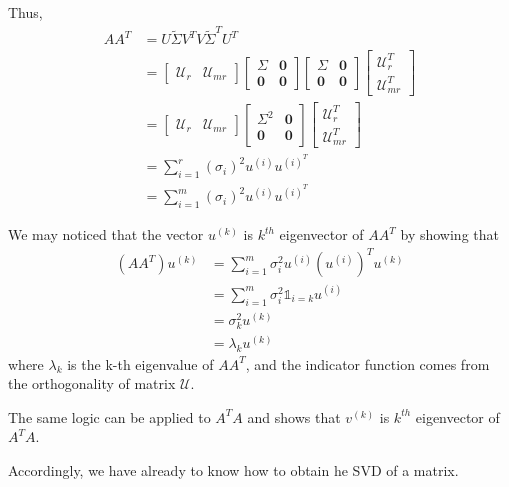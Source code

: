 Thus,
\begin{align*}
AA^T &= U\tilde{\Sigma} V^TV\tilde{\Sigma}^TU^T\\
&=
\begin{bmatrix}
\mathcal{U}_r & \mathcal{U}_{mr}
\end{bmatrix}
\begin{bmatrix}
\Sigma & \textbf{0}\\
\textbf{0}&\textbf{0}
\end{bmatrix}
\begin{bmatrix}
\Sigma & \textbf{0}\\
\textbf{0}&\textbf{0}
\end{bmatrix}
\begin{bmatrix}
\mathcal{U}_r^T\\
\mathcal{U}_{mr}^T
\end{bmatrix}\\
&
=\begin{bmatrix}
\mathcal{U}_r & \mathcal{U}_{mr}
\end{bmatrix}
\begin{bmatrix}
\Sigma^2 & \textbf{0}\\
\textbf{0}&\textbf{0}
\end{bmatrix}
\begin{bmatrix}
\mathcal{U}_r^T\\
\mathcal{U}_{mr}^T
\end{bmatrix}\\
&= \sum^r_{i=1}(\sigma_i)^2u^{(i)}u^{(i)^T}\\
&= \sum^m_{i=1}(\sigma_i)^2u^{(i)}u^{(i)^T}
\end{align*}

We may noticed that the vector $u^{(k)}$ is $k^{th}$ eigenvector of $AA^T$ by showing that
\begin{align*}
(AA^T)u^{(k)} 
& = \sum^m_{i=1}\sigma_i^2u^{(i)}(u^{(i)})^Tu^{(k)}\\
& = \sum^m_{i=1}\sigma_i^2 \mathbb{1}_{i=k} u^{(i)} \\
& = \sigma^2_ku^{(k)}\\
& = \lambda_k u^{(k)}
\end{align*}
where $\lambda_k$ is the k-th eigenvalue of $AA^T$, and the indicator function comes from the orthogonality of matrix $\mathcal{U}$.

The same logic can be applied to $A^TA$ and shows that $v^{(k)}$ is $k^{th}$ eigenvector of $A^TA$.

Accordingly, we have already to know how to obtain he SVD  of a matrix.


